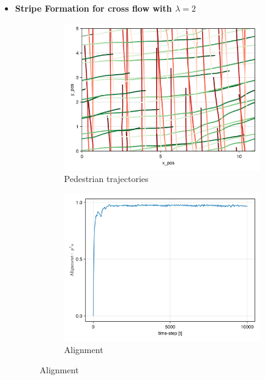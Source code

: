 \begin{itemize}
    \item \textbf{Stripe Formation for cross flow with $\lambda = 2$}
    \begin{figure}[H]
        \centering
        \begin{subfigure}{0.49\textwidth}
            \centering
            \includegraphics[width=\linewidth]{figures/ch5_collective/crossleapflow_10000.png}
            \caption{Pedestrian trajectories}
            \label{plot:cross2_traj}
        \end{subfigure}
        \begin{subfigure}{.49\textwidth}
            \centering
            \includegraphics[width=\linewidth]{figures/ch5_collective/straight_cross2.png}
            \caption{Alignment}

\end{subfigure}
\end{figure}
\end{itemize}
